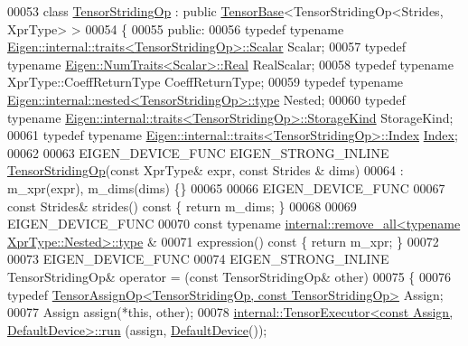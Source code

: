 \begin{DoxyCode}
00053 \textcolor{keyword}{class }\hyperlink{class_eigen_1_1_tensor_striding_op}{TensorStridingOp} : \textcolor{keyword}{public} \hyperlink{class_eigen_1_1_tensor_base}{TensorBase}<TensorStridingOp<Strides, XprType> >
00054 \{
00055   \textcolor{keyword}{public}:
00056   \textcolor{keyword}{typedef} \textcolor{keyword}{typename} \hyperlink{struct_eigen_1_1internal_1_1traits}{Eigen::internal::traits<TensorStridingOp>::Scalar}
       Scalar;
00057   \textcolor{keyword}{typedef} \textcolor{keyword}{typename} \hyperlink{group___sparse_core___module}{Eigen::NumTraits<Scalar>::Real} RealScalar;
00058   \textcolor{keyword}{typedef} \textcolor{keyword}{typename} XprType::CoeffReturnType CoeffReturnType;
00059   \textcolor{keyword}{typedef} \textcolor{keyword}{typename} \hyperlink{class_eigen_1_1internal_1_1_tensor_lazy_evaluator_writable}{Eigen::internal::nested<TensorStridingOp>::type}
       Nested;
00060   \textcolor{keyword}{typedef} \textcolor{keyword}{typename} \hyperlink{struct_eigen_1_1internal_1_1traits}{Eigen::internal::traits<TensorStridingOp>::StorageKind}
       StorageKind;
00061   \textcolor{keyword}{typedef} \textcolor{keyword}{typename} \hyperlink{struct_eigen_1_1internal_1_1traits}{Eigen::internal::traits<TensorStridingOp>::Index}
       \hyperlink{namespace_eigen_a62e77e0933482dafde8fe197d9a2cfde}{Index};
00062 
00063   EIGEN\_DEVICE\_FUNC EIGEN\_STRONG\_INLINE \hyperlink{class_eigen_1_1_tensor_striding_op}{TensorStridingOp}(\textcolor{keyword}{const} XprType& expr, \textcolor{keyword}{const} Strides
      & dims)
00064       : m\_xpr(expr), m\_dims(dims) \{\}
00065 
00066     EIGEN\_DEVICE\_FUNC
00067     \textcolor{keyword}{const} Strides& strides()\textcolor{keyword}{ const }\{ \textcolor{keywordflow}{return} m\_dims; \}
00068 
00069     EIGEN\_DEVICE\_FUNC
00070     \textcolor{keyword}{const} \textcolor{keyword}{typename} \hyperlink{group___sparse_core___module}{internal::remove\_all<typename XprType::Nested>::type}
      &
00071     expression()\textcolor{keyword}{ const }\{ \textcolor{keywordflow}{return} m\_xpr; \}
00072 
00073     EIGEN\_DEVICE\_FUNC
00074     EIGEN\_STRONG\_INLINE TensorStridingOp& operator = (\textcolor{keyword}{const} TensorStridingOp& other)
00075     \{
00076       \textcolor{keyword}{typedef} \hyperlink{class_eigen_1_1_tensor_assign_op}{TensorAssignOp<TensorStridingOp, const TensorStridingOp>}
       Assign;
00077       Assign assign(*\textcolor{keyword}{this}, other);
00078       \hyperlink{class_eigen_1_1internal_1_1_tensor_executor}{internal::TensorExecutor<const Assign, DefaultDevice>::run}
      (assign, \hyperlink{struct_eigen_1_1_default_device}{DefaultDevice}());

\end{DoxyCode}
